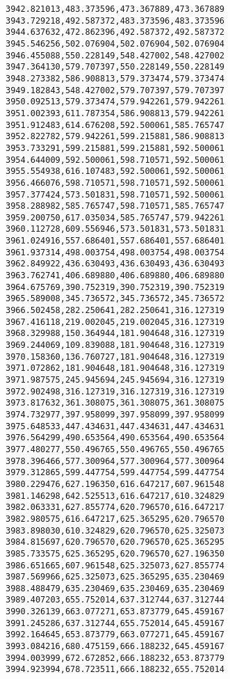 \documentclass[11pt]{article}
\begin{document}
\begin{Verbatim}[commandchars=\\\{\}]
3942.821013,483.373596,473.367889,473.367889
3943.729218,492.587372,483.373596,483.373596
3944.637632,472.862396,492.587372,492.587372
3945.546256,502.076904,502.076904,502.076904
3946.455088,550.228149,548.427002,548.427002
3947.364130,579.707397,550.228149,550.228149
3948.273382,586.908813,579.373474,579.373474
3949.182843,548.427002,579.707397,579.707397
3950.092513,579.373474,579.942261,579.942261
3951.002393,611.787354,586.908813,579.942261
3951.912483,614.676208,592.500061,585.765747
3952.822782,579.942261,599.215881,586.908813
3953.733291,599.215881,599.215881,592.500061
3954.644009,592.500061,598.710571,592.500061
3955.554938,616.107483,592.500061,592.500061
3956.466076,598.710571,598.710571,592.500061
3957.377424,573.501831,598.710571,592.500061
3958.288982,585.765747,598.710571,585.765747
3959.200750,617.035034,585.765747,579.942261
3960.112728,609.556946,573.501831,573.501831
3961.024916,557.686401,557.686401,557.686401
3961.937314,498.003754,498.003754,498.003754
3962.849922,436.630493,436.630493,436.630493
3963.762741,406.689880,406.689880,406.689880
3964.675769,390.752319,390.752319,390.752319
3965.589008,345.736572,345.736572,345.736572
3966.502458,282.250641,282.250641,316.127319
3967.416118,219.002045,219.002045,316.127319
3968.329988,150.364944,181.904648,316.127319
3969.244069,109.839088,181.904648,316.127319
3970.158360,136.760727,181.904648,316.127319
3971.072862,181.904648,181.904648,316.127319
3971.987575,245.945694,245.945694,316.127319
3972.902498,316.127319,316.127319,316.127319
3973.817632,361.308075,361.308075,361.308075
3974.732977,397.958099,397.958099,397.958099
3975.648533,447.434631,447.434631,447.434631
3976.564299,490.653564,490.653564,490.653564
3977.480277,550.496765,550.496765,550.496765
3978.396466,577.300964,577.300964,577.300964
3979.312865,599.447754,599.447754,599.447754
3980.229476,627.196350,616.647217,607.961548
3981.146298,642.525513,616.647217,610.324829
3982.063331,627.855774,620.796570,616.647217
3982.980575,616.647217,625.365295,620.796570
3983.898030,610.324829,620.796570,625.325073
3984.815697,620.796570,620.796570,625.365295
3985.733575,625.365295,620.796570,627.196350
3986.651665,607.961548,625.325073,627.855774
3987.569966,625.325073,625.365295,635.230469
3988.488479,635.230469,635.230469,635.230469
3989.407203,655.752014,637.312744,637.312744
3990.326139,663.077271,653.873779,645.459167
3991.245286,637.312744,655.752014,645.459167
3992.164645,653.873779,663.077271,645.459167
3993.084216,680.475159,666.188232,645.459167
3994.003999,672.672852,666.188232,653.873779
3994.923994,678.723511,666.188232,655.752014

\end{Verbatim}
\end{document}

